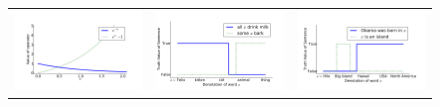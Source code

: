 %
%
%
%
\begin{figure}
\begin{center}
\begin{tabular}{ccc}
\includegraphics[scale=0.27]{../img/monotonicity_math.pdf} &
\hspace{-2em}\includegraphics[scale=0.27]{../img/monotonicity_lex_all.pdf} &
\hspace{-2em}\includegraphics[scale=0.27]{../img/monotonicity_lex_meronymy.pdf}\\

\end{tabular}
\end{center}
\end{figure}
